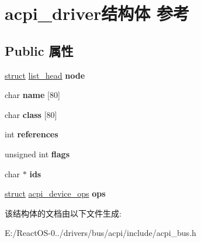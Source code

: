 \hypertarget{structacpi__driver}{}\section{acpi\+\_\+driver结构体 参考}
\label{structacpi__driver}
\subsection*{Public 属性}
\begin{DoxyCompactItemize}
\item 
\mbox{\label{structacpi__driver_a84bd744cedee96f73b5b51e86e0cc145}} 
\hyperlink{interfacestruct}{struct} \hyperlink{structlist__head}{list\+\_\+head} {\bfseries node}
\item 
\mbox{\label{structacpi__driver_a836eb19c86f91b9aaef84d20866d4955}} 
char {\bfseries name} \mbox{[}80\mbox{]}
\item 
\mbox{\label{structacpi__driver_a2681f0cbcadeb3ddfdb0e072bfbdd18c}} 
char {\bfseries class} \mbox{[}80\mbox{]}
\item 
\mbox{\label{structacpi__driver_a78c9cdbccfc10a5241f430a6cc316f45}} 
int {\bfseries references}
\item 
\mbox{\label{structacpi__driver_a2baa7a207a12bad21d45803ea181c699}} 
unsigned int {\bfseries flags}
\item 
\mbox{\label{structacpi__driver_abde646ae1ae086c388975a31caceca6d}} 
char $\ast$ {\bfseries ids}
\item 
\mbox{\label{structacpi__driver_a24c00d527ecb8167a9635cff0be1897f}} 
\hyperlink{interfacestruct}{struct} \hyperlink{structacpi__device__ops}{acpi\+\_\+device\+\_\+ops} {\bfseries ops}
\end{DoxyCompactItemize}


该结构体的文档由以下文件生成\+:\begin{DoxyCompactItemize}
\item 
E\+:/\+React\+O\+S-\/0../drivers/bus/acpi/include/acpi\+\_\+bus.\+h\end{DoxyCompactItemize}
